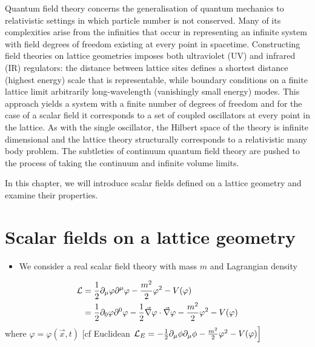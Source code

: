 
Quantum field theory concerns the generalisation of quantum mechanics to relativistic settings in which particle number is not conserved. Many of its complexities arise from the infinities that occur in representing an infinite system with field degrees of freedom existing at every point in spacetime. Constructing field theories on lattice geometries imposes both ultraviolet (UV) and infrared (IR) regulators: the distance between lattice sites defines a shortest distance (highest energy) scale that is representable, while boundary conditions on a finite lattice limit arbitrarily long-wavelength (vanishingly small  energy) modes. This approach yields a system with a finite number of degrees of freedom and for the case of a scalar field it corresponds to a set of coupled oscillators at every point in the lattice. As with the single oscillator, the Hilbert space of the theory is infinite dimensional and the lattice theory structurally corresponds to a relativistic many body problem. The subtleties of continuum quantum field theory are pushed to the process of taking the continuum and infinite volume limits.

In this chapter, we will introduce scalar fields defined on a lattice geometry and examine their properties.   
 
\section{Scalar fields on a lattice geometry}

\begin{itemize}
  \item We consider a real scalar field theory with mass \(m\) and Lagrangian density
\end{itemize}
\begin{equation}
\begin{aligned}
{\cal L} & =\frac{1}{2} \partial_{\mu} \varphi \partial^{\mu} \varphi-\frac{m^{2}}{2} \varphi^{2}-V(\varphi) \\
& =\frac{1}{2} \partial_{0} \varphi \partial^{0} \varphi-\frac{1}{2} \vec{\nabla} \varphi \cdot \vec{\nabla} \varphi-\frac{m^{2}}{2} \varphi^{2}-V(\varphi)
\end{aligned}
\end{equation}
where $\varphi=\varphi(\vec{x}, t) $
[cf Euclidean \(\left.{\cal L}_{E}=-\frac{1}{2} \partial_{\mu} \phi \partial_{\mu} \phi-\frac{m^{2}}{2} \varphi^{2}-V(\varphi)\right]\)

